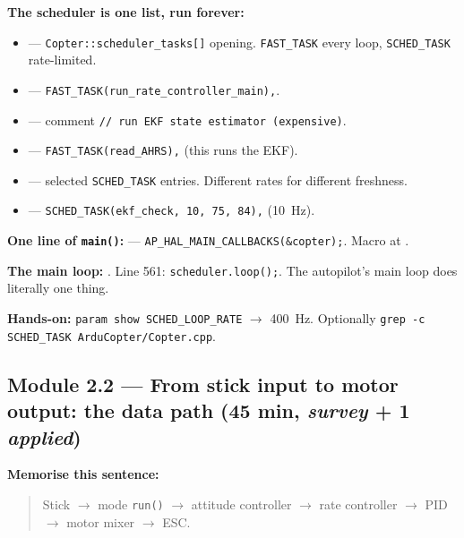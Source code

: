 \documentclass[a4paper,11pt,twoside]{article}
\begin{document}
\textbf{The scheduler is one list, run forever:}
\begin{itemize}
  \item {} --- \texttt{Copter::scheduler\_tasks[]} opening. \texttt{FAST\_TASK} every loop, \texttt{SCHED\_TASK} rate-limited.
  \item {} --- \texttt{FAST\_TASK(run\_rate\_controller\_main),}.
  \item {} --- comment \texttt{// run EKF state estimator (expensive)}.
  \item {} --- \texttt{FAST\_TASK(read\_AHRS),} (this runs the EKF).
  \item {} --- selected \texttt{SCHED\_TASK} entries. Different rates for different freshness.
  \item {} --- \texttt{SCHED\_TASK(ekf\_check, 10, 75, 84),} (10~Hz).
\end{itemize}

\textbf{One line of \texttt{main()}:}  --- \texttt{AP\_HAL\_MAIN\_CALLBACKS(\&copter);}. Macro at .

\textbf{The main loop:} . Line 561: \texttt{scheduler.loop();}. The autopilot's main loop does literally one thing.

\textbf{Hands-on:} \texttt{param show SCHED\_LOOP\_RATE} $\rightarrow$ 400~Hz. Optionally \texttt{grep -c SCHED\_TASK ArduCopter/Copter.cpp}.

\subsection{Module 2.2 --- From stick input to motor output: the data path (45 min, \emph{survey} + 1 \emph{applied})}

\textbf{Memorise this sentence:}
\begin{quote}
  Stick $\rightarrow$ mode \texttt{run()} $\rightarrow$ attitude controller $\rightarrow$ rate controller $\rightarrow$ PID $\rightarrow$ motor mixer $\rightarrow$ ESC.
\end{quote}
\end{document}
